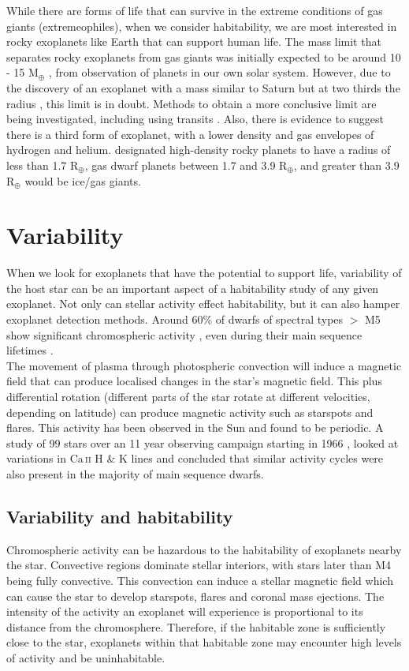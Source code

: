 While there are forms of life that can survive in the extreme conditions of gas giants (extremeophiles), when we consider habitability, we are most interested in rocky exoplanets like Earth that can support human life. The mass limit that separates rocky exoplanets from gas giants was initially expected to be around 10 - 15 M$_{\oplus}$ \citep{2006Basri}, from observation of planets in our own solar system. However, due to the discovery of an exoplanet with a mass similar to Saturn but at two thirds the radius \citep{2005Sato}, this limit is in doubt. Methods to obtain a more conclusive limit are being investigated, including using transits \citep{2015Barnes}. Also, there is evidence to suggest there is a third form of exoplanet, with a lower density and gas envelopes of hydrogen and helium. \citet{2014Buchhave} designated high-density rocky planets to have a radius of less than 1.7 R$_{\oplus}$, gas dwarf planets between 1.7 and 3.9 R$_{\oplus}$, and greater than 3.9 R$_{\oplus}$ would be ice/gas giants. 
\section{Variability}
When we look for exoplanets that have the potential to support life, variability of the host star can be an important aspect of a habitability study of any given exoplanet. Not only can stellar activity effect habitability, but it can also hamper exoplanet detection methods. Around 60\% of dwarfs of spectral types $>$ M5 show significant chromospheric activity \citep{1996Hawley}, even during their main sequence lifetimes \citep{2009Kowalski}.\\

The movement of plasma through photospheric convection will induce a magnetic field that can produce localised changes in the star's magnetic field. This plus differential rotation (different parts of the star rotate at different velocities, depending on latitude) can produce magnetic activity such as starspots and flares. This activity has been observed in the Sun and found to be periodic. A study of 99 stars over an 11 year observing campaign starting in 1966 \citep{1968Wilson,1978Wilson}, looked at variations in Ca\,\textsc{ii} H \& K lines and concluded that similar activity cycles were also present in the majority of main sequence dwarfs. 
\subsection{Variability and habitability}
\label{SecVar}
Chromospheric activity can be hazardous to the habitability of exoplanets nearby the star. Convective regions dominate stellar interiors, with stars later than M4 being fully convective. This convection can induce a stellar magnetic field which can cause the star to develop starspots, flares and coronal mass ejections. The intensity of the activity an exoplanet will experience is proportional to its distance from the chromosphere. Therefore, if the habitable zone is sufficiently close to the star, exoplanets within that habitable zone may encounter high levels of activity and be uninhabitable.\\


